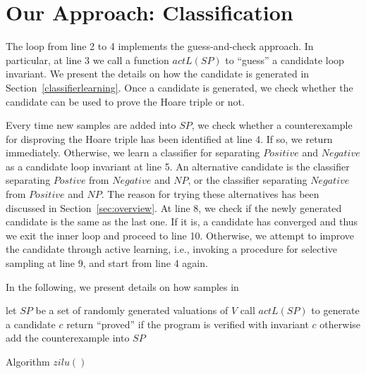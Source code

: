 \section{Our Approach: Classification}
\label{sec:classifierlearning}

The loop from line 2 to 4 implements the guess-and-check approach. In particular, at line 3 we call a function $actL(SP)$ to ``guess'' a candidate loop invariant. We present the details on how the candidate is generated in Section~\ref{classifierlearning}. Once a candidate is generated, we check whether the candidate can be used to prove the Hoare triple or not.

Every time new samples are added into $SP$, we check whether a counterexample for disproving the Hoare triple has been identified at line 4. If so, we return immediately. Otherwise, we learn a classifier for separating $Positive$ and $Negative$ as a candidate loop invariant at line 5. An alternative candidate is the classifier separating $Postive$ from $Negative$ and $NP$, or the classifier separating $Negative$ from $Positive$ and $NP$. The reason for trying these alternatives has been discussed in Section~\ref{sec:overview}. At line 8, we check if the newly generated candidate is the same as the last one. If it is, a candidate has converged and thus we exit the inner loop and proceed to line 10. Otherwise, we attempt to improve the candidate through active learning, i.e., invoking a procedure for selective sampling at line 9, and start from line 4 again.

In the following, we present details on how samples in

\begin{algorithm}[t]
\SetAlgoVlined
\Indm
\Indp
let $SP$ be a set of randomly generated valuations of $V$\;
 {
    call $actL(SP)$ to generate a candidate $c$\;
    return ``proved'' if the program is verified with invariant $c$ otherwise add the counterexample into $SP$\;
}
\caption{Algorithm $zilu()$}
\label{alg:active}
\end{algorithm}



